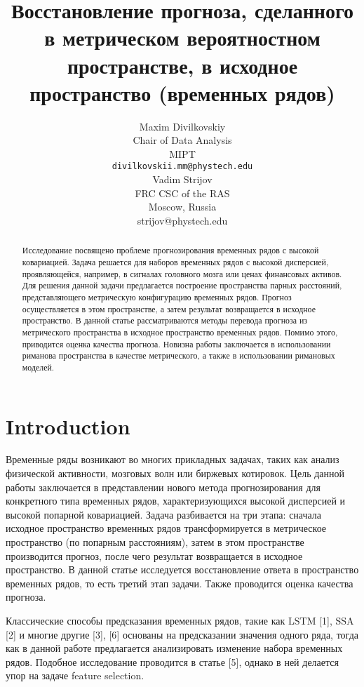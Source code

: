 \documentclass{article}
\title{Восстановление прогноза, сделанного в метрическом вероятностном пространстве, в исходное пространство (временных рядов)}
\author{ Maxim Divilkovskiy \\
	Chair of Data Analysis\\
	MIPT\\
	\texttt{divilkovskii.mm@phystech.edu} \\
	\And
	Vadim Strijov \\
	FRC CSC of the RAS\\
	Moscow, Russia\\
        strijov@phystech.edu \\
}
\date{}
\begin{document}
\maketitle

\begin{abstract}
	Исследование посвящено проблеме прогнозирования временных рядов с высокой ковариацией. Задача решается для наборов временных рядов с высокой дисперсией, проявляющейся, например, в сигналах головного мозга или ценах финансовых активов. Для решения данной задачи предлагается построение пространства парных расстояний, представляющего метрическую конфигурацию временных рядов. Прогноз осуществляется в этом пространстве, а затем результат возвращается в исходное пространство.
	В данной статье рассматриваются методы перевода прогноза из метрического пространства в исходное пространство временных рядов. Помимо этого, приводится оценка качества прогноза. Новизна работы заключается в использовании риманова пространства в качестве метрического, а также в использовании римановых моделей.


\end{abstract}



\section{Introduction}
	Временные ряды возникают во многих прикладных задачах, таких как анализ физической активности, мозговых волн или биржевых котировок. Цель данной работы заключается в представлении нового метода прогнозирования для конкретного типа временных рядов, характеризующихся высокой дисперсией и высокой попарной ковариацией. Задача разбивается на три этапа: сначала исходное пространство временных рядов трансформируется в метрическое пространство (по попарным расстояниям), затем в этом пространстве производится прогноз, после чего результат возвращается в исходное пространство. В данной статье исследуется восстановление ответа в пространство временных рядов, то есть третий этап задачи. Также проводится оценка качества прогноза.
		
	Классические способы предсказания временных рядов, такие как LSTM [1], SSA [2] и многие другие [3], [6] основаны на предсказании значения одного ряда, тогда как в данной работе предлагается анализировать изменение набора временных рядов. Подобное исследование проводится в статье [5], однако в ней делается упор на задаче feature selection.
	
\end{document}
